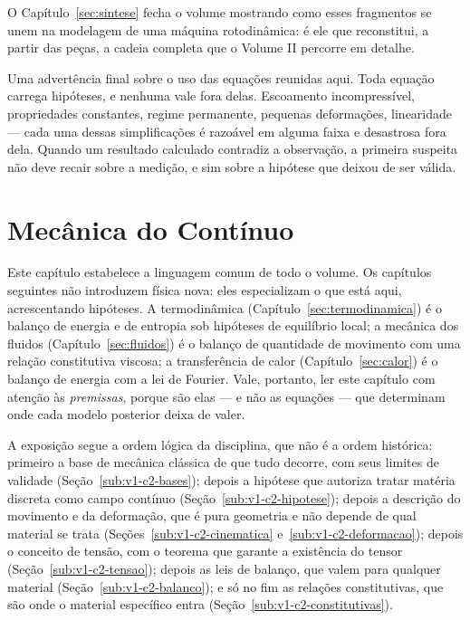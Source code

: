 \documentclass[12pt,a4paper]{article}
\numberwithin{equation}{section}
\numberwithin{table}{section}
\numberwithin{figure}{section}
\begin{document}
O Capítulo~\ref{sec:sintese} fecha o volume mostrando como esses fragmentos se
unem na modelagem de uma máquina rotodinâmica: é ele que reconstitui, a partir
das peças, a cadeia completa que o Volume II percorre em detalhe.

Uma advertência final sobre o uso das equações reunidas aqui. Toda equação
carrega hipóteses, e nenhuma vale fora delas. Escoamento incompressível,
propriedades constantes, regime permanente, pequenas deformações, linearidade
--- cada uma dessas simplificações é razoável em alguma faixa e desastrosa
fora dela. Quando um resultado calculado contradiz a observação, a primeira
suspeita não deve recair sobre a medição, e sim sobre a hipótese que deixou de
ser válida.


\section{Mecânica do Contínuo}\label{sec:continuo}

Este capítulo estabelece a linguagem comum de todo o volume. Os capítulos
seguintes não introduzem física nova: eles especializam o que está aqui,
acrescentando hipóteses. A termodinâmica (Capítulo~\ref{sec:termodinamica}) é
o balanço de energia e de entropia sob hipóteses de equilíbrio local; a
mecânica dos fluidos (Capítulo~\ref{sec:fluidos}) é o balanço de quantidade de
movimento com uma relação constitutiva viscosa; a transferência de calor
(Capítulo~\ref{sec:calor}) é o balanço de energia com a lei de Fourier. Vale,
portanto, ler este capítulo com atenção às \emph{premissas}, porque são elas
--- e não as equações --- que determinam onde cada modelo posterior deixa de
valer.

A exposição segue a ordem lógica da disciplina, que não é a ordem histórica:
primeiro a base de mecânica clássica de que tudo decorre, com seus limites de
validade (Seção~\ref{sub:v1-c2-bases}); depois a hipótese que autoriza tratar
matéria discreta como campo contínuo (Seção~\ref{sub:v1-c2-hipotese}); depois
a descrição do movimento e da
deformação, que é pura geometria e não depende de qual material se trata
(Seções~\ref{sub:v1-c2-cinematica} e~\ref{sub:v1-c2-deformacao}); depois o
conceito de tensão, com o teorema que garante a existência do tensor
(Seção~\ref{sub:v1-c2-tensao}); depois as leis de balanço, que valem para
qualquer material (Seção~\ref{sub:v1-c2-balanco}); e só no fim as relações
constitutivas, que são onde o material específico entra
(Seção~\ref{sub:v1-c2-constitutivas}).
\end{document}

